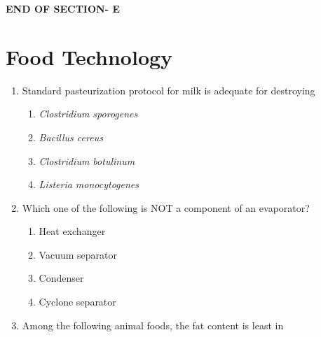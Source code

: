 \documentclass[journal,12pt,onecolumn]{IEEEtran}
\begin{document}
\vspace{2\baselineskip}
\begin{center}
    \item[\textbf{END OF SECTION- E}]
\end{center}



\newpage
\section*{Food Technology}
\vspace{1cm}
\begin{enumerate}[label=\arabic*)]

\item Standard pasteurization protocol for milk is adequate for destroying
\hfill{} \\

\vspace{0.2cm}
\begin{enumerate}[label=\alph*)]
\item \textit{Clostridium sporogenes}
\item \textit{Bacillus cereus}
\item \textit{Clostridium botulinum}
\item \textit{Listeria monocytogenes}
\end{enumerate}

\vspace{0.5cm}

\item Which one of the following is NOT a component of an evaporator?
\hfill{} \\

\vspace{0.2cm}
\begin{enumerate}[label=\alph*)]
\item Heat exchanger
\item Vacuum separator
\item Condenser
\item Cyclone separator
\end{enumerate}

\vspace{0.5cm}

\item Among the following animal foods, the fat content is least in
\hfill{} \\


\end{enumerate}
\end{document}
